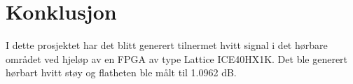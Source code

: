 \section{Konklusjon}
\label{sec:conclusion}

I dette prosjektet har det blitt generert tilnermet hvitt signal i det hørbare området ved hjeløp av en FPGA av type Lattice ICE40HX1K. Det ble generert hørbart hvitt støy og flatheten ble målt til 1.0962 dB. 